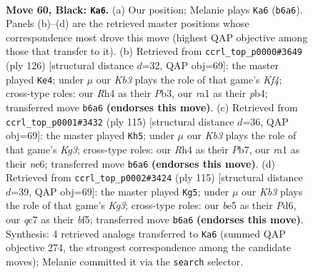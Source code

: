 \documentclass[11pt]{article}
\begin{document}
\clearpage

\begin{figure}[p]\centering
\begin{subfigure}{0.46\textwidth}\centering
\resizebox{\linewidth}{!}{%
\newchessgame
\chessboard[
  setfen={8/2Q5/1k6/p2pBp2/P6r/8/8/RN4K1 b - - 1 60},
  showmover=false,
  pgfstyle=straightmove, color=movearrow, markmove={b6-a6}
]}
\caption{}
\end{subfigure}\hfill
\begin{subfigure}{0.46\textwidth}\centering
\resizebox{\linewidth}{!}{%
\newchessgame
\chessboard[
  setfen={3k2B1/R5p1/8/2r1b3/1p3K2/1P4P1/8/8 w - - 18 64},
  showmover=false,
  pgfstyle=straightmove, color=movearrow, markmove={f4-e4}
]}
\caption{}
\end{subfigure}
\\[4pt]
\begin{subfigure}{0.46\textwidth}\centering
\resizebox{\linewidth}{!}{%
\newchessgame
\chessboard[
  setfen={8/pp6/4NRk1/3bB1p1/8/P6r/1P1K4/8 b - - 9 58},
  showmover=false,
  pgfstyle=straightmove, color=movearrow, markmove={g6-h5}
]}
\caption{}
\end{subfigure}\hfill
\begin{subfigure}{0.46\textwidth}\centering
\resizebox{\linewidth}{!}{%
\newchessgame
\chessboard[
  setfen={5R2/8/3p2k1/1p3B1p/1P6/2b4P/P5K1/2r5 b - - 16 58},
  showmover=false,
  pgfstyle=straightmove, color=movearrow, markmove={g6-g5}
]}
\caption{}
\end{subfigure}
\caption{\textbf{Move 60, Black: \texttt{Ka6}.} (a) Our position; Melanie plays \texttt{Ka6} (\texttt{b6a6}). Panels (b)--(d) are the retrieved master positions whose correspondence most drove this move (highest QAP objective among those that transfer to it). (b) Retrieved from \texttt{ccrl\_top\_p0000\#3649} (ply 126) [structural distance $d$=32, QAP obj=69]: the master played \texttt{Ke4}; under $\mu$ our \emph{Kb3} plays the role of that game's \emph{Kf4}; cross-type roles: our \emph{R}h4 as their \emph{P}b3, our \emph{r}a1 as their \emph{p}b4; transferred move \texttt{b6a6} \textbf{(endorses this move)}. (c) Retrieved from \texttt{ccrl\_top\_p0001\#3432} (ply 115) [structural distance $d$=36, QAP obj=69]: the master played \texttt{Kh5}; under $\mu$ our \emph{Kb3} plays the role of that game's \emph{Kg3}; cross-type roles: our \emph{R}h4 as their \emph{P}b7, our \emph{r}a1 as their \emph{n}e6; transferred move \texttt{b6a6} \textbf{(endorses this move)}. (d) Retrieved from \texttt{ccrl\_top\_p0002\#3424} (ply 115) [structural distance $d$=39, QAP obj=69]: the master played \texttt{Kg5}; under $\mu$ our \emph{Kb3} plays the role of that game's \emph{Kg3}; cross-type roles: our \emph{b}e5 as their \emph{P}d6, our \emph{q}c7 as their \emph{b}f5; transferred move \texttt{b6a6} \textbf{(endorses this move)}. Synthesis: 4 retrieved analogs transferred to \texttt{Ka6} (summed QAP objective 274, the strongest correspondence among the candidate moves); Melanie committed it via the \texttt{search} selector.}
\label{fig:thought-m119}
\end{figure}
\end{document}

